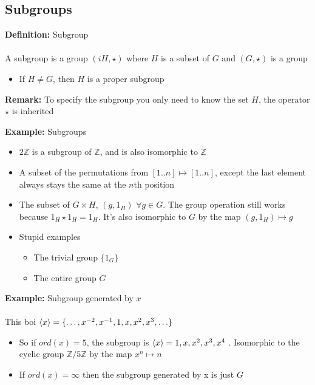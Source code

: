 \documentclass{article}
\newcommand{\Z}{\mathbb{Z}}
\begin{document}
\subsection{Subgroups}
\begin{definition} 
\textbf{Definition:} Subgroup \\
~\\
A {\color{blue} subgroup} is a group $(iH,\star)$ where $H$ is a subset of $G$ and $(G,\star)$ is a group

\end{definition}
\begin{itemize}
	\item If $H \neq G$, then $H$ is a {\color{blue} proper subgroup}
\end{itemize}
\begin{remark} 
\textbf{Remark:} To specify the subgroup you only need to know the set $H$, the operator $\star$ is inherited 
\end{remark}
\begin{example} 
\textbf{Example:} Subgroups
\begin{itemize}
	\item $2 \Z$ is a subgroup of $\Z$, and is also isomorphic to $\Z$
	\item A subset of the permutations from $[1..n] \mapsto [1..n]$, except the last element always stays the same at the $n$th position
	\item The subset of $G\times H$, $(g,1_H)$ $\forall g\in G$. The group operation still works because $1_H \star 1_H = 1_H$. It's also isomorphic to $G$ by the map $(g,1_H) \mapsto g$
	\item Stupid examples 
		\begin{itemize}
			\item The trivial group $\{1_G\}$
			\item The entire group $G$
		\end{itemize}
\end{itemize}
\end{example}
\begin{example} 
\textbf{Example:} Subgroup generated by $x$ \\
~\\
This boi $\braket{x} = \{\ldots, x^{-2}, x^{-1}, 1, x, x^2, x^3, \ldots\} $
\begin{itemize}
	\item So if $ord(x) = 5$, the subgroup is $\braket{x} = {1,x,x^2,x^3,x^4}$ . Isomorphic to the cyclic group ${\Z}/{5\Z}$ by the map $x^n \mapsto n$
	\item If $ord(x) = \infty$ then the subgroup generated by x is just $G$	
\end{itemize}
\end{example}
\end{document}

